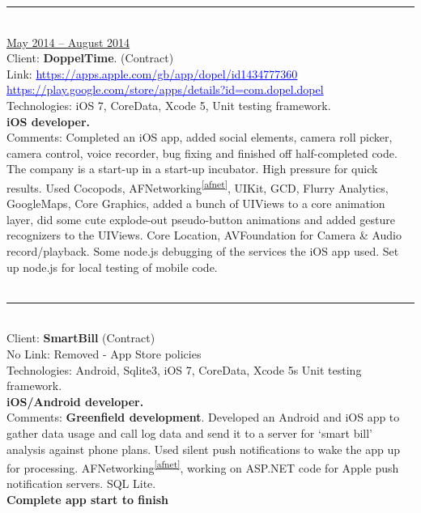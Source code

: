 \documentclass{article}
\begin{document}
\noindent\hfil\rule{0.5\textwidth}{.4pt}\hfil
\\

 \underline{May 2014 – August 2014} \\
Client: 	\textbf  {DoppelTime}.  (Contract) \\
Link: \textcolor{blue}{ \underline{https://apps.apple.com/gb/app/dopel/id1434777360}} \\
\textcolor{blue}{ \underline{ https://play.google.com/store/apps/details?id=com.dopel.dopel   }}  \\
Technologies: 	iOS 7, CoreData, Xcode 5, Unit testing framework. \\
\textbf{ 		iOS developer. } \\
Comments:	Completed an iOS app, added social elements, camera roll picker, camera control, voice recorder, bug fixing and finished off half-completed code. The company is a start-up in a start-up incubator. High pressure for quick results.  Used Cocopods, AFNetworking\textsuperscript{\ref{afnet}}, UIKit, GCD, Flurry Analytics, GoogleMaps, Core Graphics, added a bunch of UIViews to a core animation layer, did some cute explode-out pseudo-button animations and added gesture recognizers to the UIViews.  Core Location, AVFoundation for Camera \& Audio record/playback. Some node.js debugging of the services the iOS app used. Set up node.js for local testing of mobile code. \\
\\

\noindent\hfil\rule{0.5\textwidth}{.4pt}\hfil
\\

Client: 	\textbf  {SmartBill} (Contract) \\
No Link: Removed - App Store policies \\
Technologies: 	Android, Sqlite3, iOS 7, CoreData, Xcode 5s Unit testing framework.  \\
\textbf{ iOS/Android developer.  }\\
Comments:	\textbf { Greenfield development}. Developed an Android and iOS app to gather data usage and call log data and send it to a server for ‘smart bill’ analysis against phone plans. Used silent push notifications to wake the app up for processing. AFNetworking\textsuperscript{\ref{afnet}}, working on ASP.NET code for Apple push notification servers. SQL Lite. \\
\textbf{Complete app start to finish} \\
\\
\end{document}
